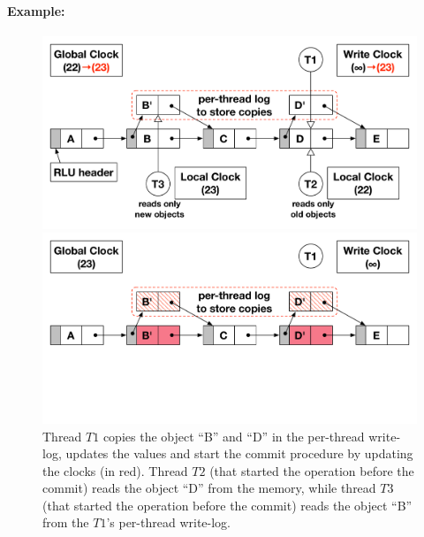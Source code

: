 \begin{refsection}

\paragraph{Example:}

\begin{figure}[t]
  \begin{minipage}[b]{0.47\textwidth}
    \begin{flushleft}
      \centering
      \includegraphics[width=1.0\textwidth]{figures/rlu_ex1}
      \caption{Thread $T1$ copies the object ``B'' and ``D'' in the per-thread
        write-log, updates the values and start the commit procedure by
        updating the clocks (in red). Thread $T2$ (that started the operation
        before the commit) reads the object ``D'' from the memory, while
        thread $T3$ (that started the operation before the commit) reads the
        object ``B'' from the $T1$'s per-thread write-log.}
      \label{fig:rlu_ex1}
    \end{flushleft}
  \end{minipage}
  \hfill
  \begin{minipage}[b]{0.47\textwidth}
    \begin{flushright}
      \centering
      \includegraphics[width=1.0\textwidth]{figures/rlu_ex2}

\end{flushright}
\end{minipage}
\end{figure}
\end{refsection}
